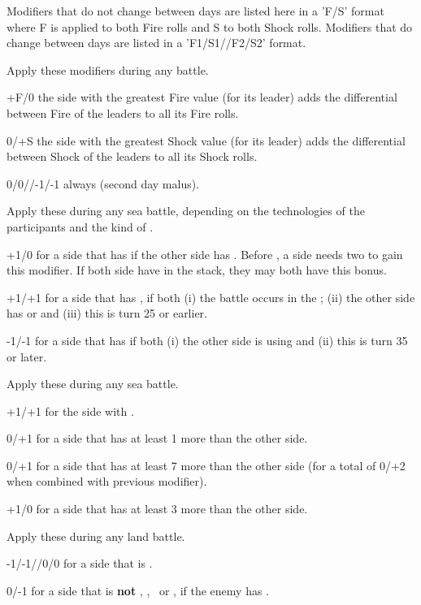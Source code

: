 Modifiers that do not change between days are listed here in a 'F/S' format
where F is applied to both Fire rolls and S to both Shock rolls. Modifiers
that do change between days are listed in a 'F1/S1//F2/S2' format.

 Apply these modifiers during any battle.
\begin{modlist}
\item[+F/0] the side with the greatest Fire value (for its leader) adds
  the differential between Fire of the leaders to all its Fire rolls.
\item[0/+S] the side with the greatest Shock value (for its leader) adds
  the differential between Shock of the leaders to all its Shock rolls.
\item[0/0//-1/-1] always (second day malus).
\end{modlist}

 Apply these during any sea battle,
depending on the technologies of the participants and the kind of .
\begin{modlist}
\item[+1/0] for a side that has \VGD if the other side has \NGD. Before
  \TBAT, a side needs two \VGD to gain this modifier. If both side have \VGD
  in the stack, they may both have this bonus.
\item[+1/+1] for a side that has \NGD, if both (i) the battle occurs in
  the ; (ii) the other side has \NWD or \NTD and (iii)
  this is turn 25 or earlier.
\item[-1/-1] for a side that has \NGD if both (i) the other side is
  using \NWD and (ii) this is turn 35 or later.
\end{modlist}

 Apply these during any sea battle.
\begin{modlist}
\item[+1/+1] for the side with .
\item[0/+1] for a side that has at least 1 more \ND than the other side.
\item[0/+1] for a side that has at least 7 more \ND than the other side
  (for a total of 0/+2 when combined with previous modifier).
\item[+1/0] for a side that has at least 3 more \ND than the other side.
\end{modlist}

 Apply these during any land battle.
\begin{modlist}
\item[-1/-1//0/0] for a side that is .
\item[0/-1] for a side that is \textbf{not} \CAI, \CAIM, \CAII or
  \CAIIM, if the enemy has \TTER.
\end{modlist}

